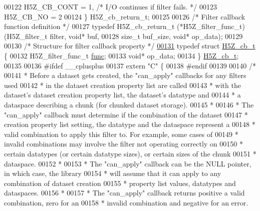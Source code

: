 \begin{DoxyCode}
00122     H5Z\_CB\_CONT   = 1,    \textcolor{comment}{/* I/O continues if filter fails.   */}
00123     H5Z\_CB\_NO     = 2
00124 \} H5Z\_cb\_return\_t;
00125 
00126 \textcolor{comment}{/* Filter callback function definition */}
00127 \textcolor{keyword}{typedef} H5Z\_cb\_return\_t (*H5Z\_filter\_func\_t)(H5Z\_filter\_t filter, \textcolor{keywordtype}{void}* buf,
00128                                 \textcolor{keywordtype}{size\_t} buf\_size, \textcolor{keywordtype}{void}* op\_data);
00129 
00130 \textcolor{comment}{/* Structure for filter callback property */}
\hyperlink{struct_h5_z__cb__t}{00131} \textcolor{keyword}{typedef} \textcolor{keyword}{struct }\hyperlink{struct_h5_z__cb__t}{H5Z\_cb\_t} \{
00132     H5Z\_filter\_func\_t \hyperlink{structfunc}{func};
00133     \textcolor{keywordtype}{void}*              op\_data;
00134 \} \hyperlink{struct_h5_z__cb__t}{H5Z\_cb\_t};
00135 
00136 \textcolor{preprocessor}{#ifdef \_\_cplusplus}
00137 \textcolor{keyword}{extern} \textcolor{stringliteral}{"C"} \{
00138 \textcolor{preprocessor}{#endif}
00139 
00140 \textcolor{comment}{/*}
00141 \textcolor{comment}{ * Before a dataset gets created, the "can\_apply" callbacks for any filters used}
00142 \textcolor{comment}{ * in the dataset creation property list are called}
00143 \textcolor{comment}{ * with the dataset's dataset creation property list, the dataset's datatype and}
00144 \textcolor{comment}{ * a dataspace describing a chunk (for chunked dataset storage).}
00145 \textcolor{comment}{ *}
00146 \textcolor{comment}{ * The "can\_apply" callback must determine if the combination of the dataset}
00147 \textcolor{comment}{ * creation property list setting, the datatype and the dataspace represent a}
00148 \textcolor{comment}{ * valid combination to apply this filter to.  For example, some cases of}
00149 \textcolor{comment}{ * invalid combinations may involve the filter not operating correctly on}
00150 \textcolor{comment}{ * certain datatypes (or certain datatype sizes), or certain sizes of the chunk}
00151 \textcolor{comment}{ * dataspace.}
00152 \textcolor{comment}{ *}
00153 \textcolor{comment}{ * The "can\_apply" callback can be the NULL pointer, in which case, the library}
00154 \textcolor{comment}{ * will assume that it can apply to any combination of dataset creation}
00155 \textcolor{comment}{ * property list values, datatypes and dataspaces.}
00156 \textcolor{comment}{ *}
00157 \textcolor{comment}{ * The "can\_apply" callback returns positive a valid combination, zero for an}
00158 \textcolor{comment}{ * invalid combination and negative for an error.}

\end{DoxyCode}

